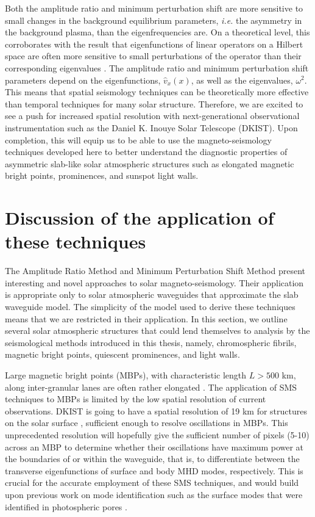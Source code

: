 Both the amplitude ratio and minimum perturbation shift are more sensitive to small changes in the background equilibrium parameters, \emph{i.e.} the asymmetry in the background plasma, than the eigenfrequencies are. On a theoretical level, this corroborates with the result that eigenfunctions of linear operators on a Hilbert space are often more sensitive to small perturbations of the operator than their corresponding eigenvalues \citep{kat95}. The amplitude ratio and minimum perturbation shift parameters depend on the eigenfunctions, $\widehat{v}_x(x)$, as well as the eigenvalues, $\omega^2$. This means that spatial seismology techniques can be theoretically more effective than temporal techniques for many solar structure. Therefore, we are excited to see a push for increased spatial resolution with next-generational observational instrumentation such as the Daniel K. Inouye Solar Telescope (DKIST). Upon completion, this will equip us to be able to use the magneto-seismology techniques developed here to better understand the diagnostic properties of asymmetric slab-like solar atmospheric structures such as elongated magnetic bright points, prominences, and sunspot light walls.


\section{Discussion of the application of these techniques}
\label{sec: SMS discussion}

The Amplitude Ratio Method and Minimum Perturbation Shift Method present interesting and novel approaches to solar magneto-seismology. Their application is appropriate only to solar atmospheric waveguides that approximate the slab waveguide model. The simplicity of the model used to derive these techniques means that we are restricted in their application. In this section, we outline several solar atmospheric structures that could lend themselves to analysis by the seismological methods introduced in this thesis, namely, chromospheric fibrils, magnetic bright points, quiescent prominences, and light walls.



Large magnetic bright points (MBPs), with characteristic length $L > 500$ km, along inter-granular lanes are often rather elongated \citep{cro_etal10}. The application of SMS techniques to MBPs is limited by the low spatial resolution of current observations. DKIST is going to have a spatial resolution of 19 km for structures on the solar surface \citep{tri_etal15}, sufficient enough to resolve oscillations in MBPs. This unprecedented resolution will hopefully give the sufficient number of pixels (5-10) across an MBP to determine whether their oscillations have maximum power at the boundaries of or within the waveguide, that is, to differentiate between the transverse eigenfunctions of surface and body MHD modes, respectively. This is crucial for the accurate employment of these SMS techniques, and would build upon previous work on mode identification such as the surface modes that were identified in photospheric pores \citep{mor_etal15}.

